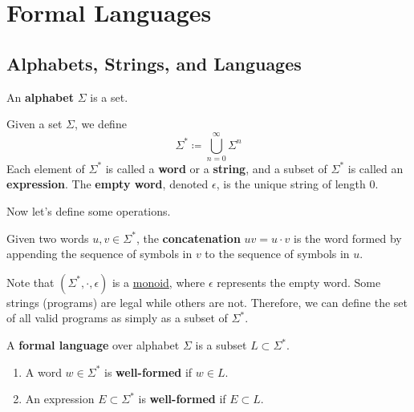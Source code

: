 \section{Formal Languages} 

\subsection{Alphabets, Strings, and Languages}

	\begin{definition}[Alphabet]
		\label{def:alphabet}
    An \textbf{alphabet} $\Sigma$ is a set. 
  \end{definition}

  \begin{definition}
    \label{def:kleene-star}
    Given a set $\Sigma$, we define
    \begin{equation}
      \Sigma^\ast \coloneqq \bigcup_{n=0}^\infty \Sigma^n
    \end{equation}
    Each element of $\Sigma^\ast$ is called a \textbf{word} or a \textbf{string}, and a subset of $\Sigma^\ast$ is called an \textbf{expression}. The \textbf{empty word}, denoted $\epsilon$, is the unique string of length $0$. 
  \end{definition}

  Now let's define some operations. 

  \begin{definition}[Concatenation]
    \label{def:concatenation}
    Given two words $u, v \in \Sigma^\ast$, the \textbf{concatenation} $uv = u \cdot v$ is the word formed by appending the sequence of symbols in $v$ to the sequence of symbols in $u$. 
  \end{definition}

  Note that $(\Sigma^\ast, \cdot, \epsilon)$ is a \hyperref[alg-def:monoid]{monoid}, where $\epsilon$ represents the empty word. Some strings (programs) are legal while others are not. Therefore, we can define the set of all valid programs as simply as a subset of $\Sigma^\ast$. 

  \begin{definition}
    \label{def:formal-language}
    A \textbf{formal language} over alphabet $\Sigma$ is a subset $L \subset \Sigma^\ast$. 
    \begin{enumerate}
      \item A word $w \in \Sigma^\ast$ is \textbf{well-formed} if $w \in L$. 
      \item An expression $E \subset \Sigma^\ast$ is \textbf{well-formed} if $E \subset L$. 
    \end{enumerate}
  \end{definition}

